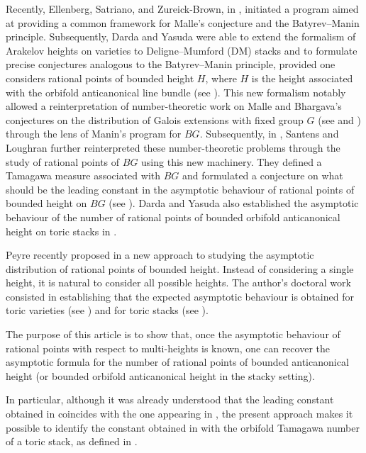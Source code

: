 \documentclass{proc-l}
\theoremstyle{definition}
\theoremstyle{remark}
\numberwithin{equation}{section}
\begin{document}
Recently, Ellenberg, Satriano, and Zureick-Brown, in \cite{ellenberg2022heights},
initiated a program aimed at providing a common framework for Malle’s conjecture
and the Batyrev--Manin principle. Subsequently, Darda and Yasuda were able to
extend the formalism of Arakelov heights on varieties to Deligne--Mumford (DM)
stacks and to formulate precise conjectures analogous to the Batyrev--Manin
principle, provided one considers rational points of bounded height $H$, where
$H$ is the height associated with the orbifold anticanonical line bundle (see
\cite[Definition~4.3, Definition~9.1 and Conjecture~5.6]{darda2024batyrevmanin}).
This new formalism notably allowed a reinterpretation of number-theoretic work on Malle and Bhargava's conjectures on the distribution of Galois extensions with fixed group $G$ (see \cite{Malle2002,Malle2004} and \cite{bhargava_mass_formula}) through the lens of Manin's program for $BG$. Subsequently, in \cite{loughran_santens_malle_conjecture}, Santens and Loughran further reinterpreted these number-theoretic problems through the study of rational points of $BG$ using this new machinery. They defined a Tamagawa measure associated with $BG$ and formulated a conjecture on what should be the leading constant in the asymptotic behaviour of rational points of bounded height on $BG$ (see \cite[Definition 8.7 and Conjecture 9.1]{loughran_santens_malle_conjecture}). Darda and Yasuda also established the asymptotic behaviour of the number of rational points of bounded orbifold anticanonical height on toric stacks in \cite[Theorem 1.1]{darda_yasuda_toric_stacks_batyrev}.

Peyre recently proposed in \cite[Question 4.8]{Peyre_beyond_height} a new approach to studying the asymptotic distribution of rational points of bounded height. Instead of considering a single height, it is natural to consider all possible heights. The author's doctoral work consisted in establishing that the expected asymptotic behaviour is obtained for toric varieties (see \cite[Theorem 2.15]{bongiorno2024multiheightanalysisrationalpoints}) and for toric stacks (see \cite[Theorem 1.1]{bongiorno_toric_stacks}).

The purpose of this article is to show that, once the asymptotic behaviour of rational
points with respect to multi-heights is known, one can recover the asymptotic formula
for the number of rational points of bounded anticanonical height (or bounded orbifold
anticanonical height in the stacky setting).

In particular, although it was already understood that the leading constant obtained in
\cite[Theorem~2.15]{bongiorno2024multiheightanalysisrationalpoints} coincides with the
one appearing in \cite[Theorem~11.49]{salberger_torsor}, the present approach makes it
possible to identify the constant obtained in
\cite[Corollary~4.4.5]{darda_yasuda_toric_stacks_batyrev} with the orbifold Tamagawa
number of a toric stack, as defined in
\cite[Definition~6.51,Theorem 6.52]{bongiorno_toric_stacks}.
\end{document}
